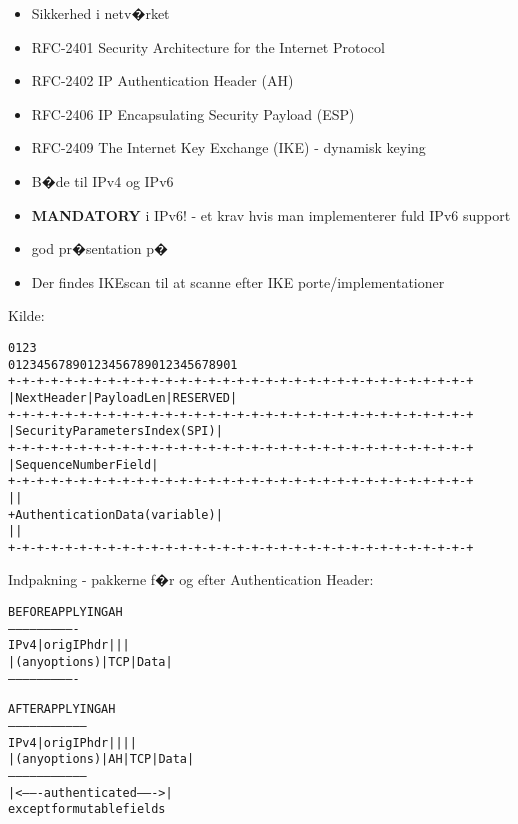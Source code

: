 
\begin{itemize}
\item Sikkerhed i netv�rket
\item RFC-2401 Security Architecture for the Internet Protocol
\item RFC-2402 IP Authentication Header (AH)
\item RFC-2406 IP Encapsulating Security Payload (ESP)
\item RFC-2409 The Internet Key Exchange (IKE) - dynamisk keying
\item B�de til IPv4 og IPv6
\item {\bfseries MANDATORY} i IPv6! - et krav hvis man implementerer
  fuld IPv6 support
\item god pr�sentation p� 
\item Der findes IKEscan til at scanne efter IKE
  porte/implementationer\\
\end{itemize}


\centerline{Kilde: }



\begin{alltt}
\small
    0                   1                   2                   3
    0 1 2 3 4 5 6 7 8 9 0 1 2 3 4 5 6 7 8 9 0 1 2 3 4 5 6 7 8 9 0 1
   +-+-+-+-+-+-+-+-+-+-+-+-+-+-+-+-+-+-+-+-+-+-+-+-+-+-+-+-+-+-+-+-+
   | Next Header   |  Payload Len  |          RESERVED             |
   +-+-+-+-+-+-+-+-+-+-+-+-+-+-+-+-+-+-+-+-+-+-+-+-+-+-+-+-+-+-+-+-+
   |                 Security Parameters Index (SPI)               |
   +-+-+-+-+-+-+-+-+-+-+-+-+-+-+-+-+-+-+-+-+-+-+-+-+-+-+-+-+-+-+-+-+
   |                    Sequence Number Field                      |
   +-+-+-+-+-+-+-+-+-+-+-+-+-+-+-+-+-+-+-+-+-+-+-+-+-+-+-+-+-+-+-+-+
   |                                                               |
   +                Authentication Data (variable)                 |
   |                                                               |
   +-+-+-+-+-+-+-+-+-+-+-+-+-+-+-+-+-+-+-+-+-+-+-+-+-+-+-+-+-+-+-+-+
\end{alltt}


Indpakning - pakkerne f�r og efter Authentication Header:
\begin{alltt}
\small
                BEFORE APPLYING AH
            ----------------------------
      IPv4  |orig IP hdr  |     |      |
            |(any options)| TCP | Data |
            ----------------------------

                  AFTER APPLYING AH
            ---------------------------------
      IPv4  |orig IP hdr  |    |     |      |
            |(any options)| AH | TCP | Data |
            ---------------------------------
            |<------- authenticated ------->|
                 except for mutable fields
\end{alltt}

